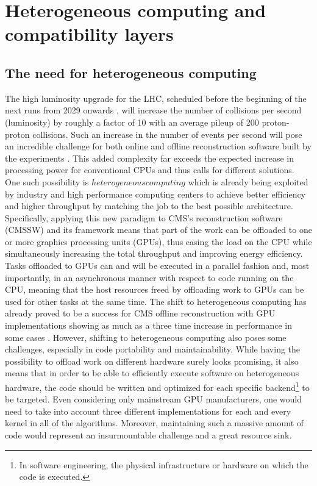 \section{Heterogeneous computing and compatibility layers }
\label{ch:heterogeneous_compatibility}

\subsection{The need for heterogeneous computing}
\label{ch:heterogeneous}
The high luminosity upgrade for the LHC, scheduled before the beginning of the next runs from 2029 onwards , will increase the number of collisions per second (luminosity) by roughly a factor of 10 with an average pileup of 200 proton-proton collisions. Such an increase in the number of events per second will pose an incredible challenge for both online and offline reconstruction software built by the experiments \cite{high_luminosity}. This added complexity far exceeds the expected increase in processing power for conventional CPUs and thus calls for different solutions. One such possibility is $heterogeneous computing$ which is already being exploited by industry and high performance computing centers to achieve better efficiency and higher throughput by matching the job to the best possible architecture. Specifically, applying this new paradigm to CMS's reconstruction software (CMSSW) and its framework means that part of the work can be offloaded to one or more graphics processing units (GPUs), thus easing the load on the CPU while simultaneously increasing the total throughput and improving energy efficiency. Tasks offloaded to GPUs can and will be executed in a parallel fashion and, most importantly, in an asynchronous manner with respect to code running on the CPU, meaning that the host resources freed by offloading work to GPUs can be used for other tasks at the same time. The shift to heterogeneous computing has already proved to be a success for CMS offline reconstruction with GPU implementations showing as much as a three time increase in performance in some cases \cite{high_luminosity}. However, shifting to heterogeneous computing also poses some challenges, especially in code portability and maintainability. While having the possibility to offload work on different hardware surely looks promising, it also means that in order to be able to efficiently execute software on heterogeneous hardware, the code should be written and optimized for each specific backend\footnote{In software engineering, the physical infrastructure or hardware on which the code is executed.} to be targeted. Even considering only mainstream GPU manufacturers, one would need to take into account three different implementations for each and every kernel in all of the algorithms. Moreover, maintaining such a massive amount of code would represent an insurmountable challenge and a great resource sink. 

